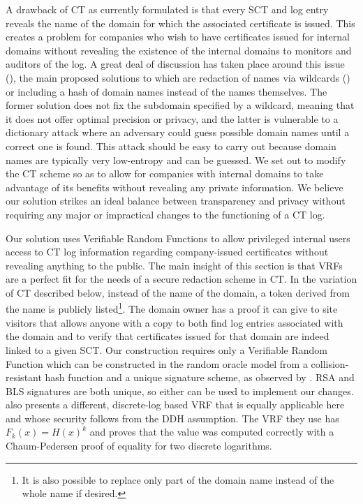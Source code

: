 \documentclass[letterpaper,twocolumn,10pt]{article}
\begin{document}
A drawback of CT as currently formulated is that every SCT and log entry reveals the name of the domain for which the associated certificate is issued. This creates a problem for companies who wish to have certificates issued for internal domains without revealing the existence of the internal domains to monitors and auditors of the log. A great deal of discussion has taken place around this issue (\cite{redaction-disc}), the main proposed solutions to which are redaction of names via wildcards (\cite{RFC-bis}) or including a hash of domain names instead of the names themselves. The former solution does not fix the subdomain specified by a wildcard, meaning that it does not offer optimal precision or privacy, and the latter is vulnerable to a dictionary attack where an adversary could guess possible domain names until a correct one is found. This attack should be easy to carry out because domain names are typically very low-entropy and can be guessed. We set out to modify the CT scheme so as to allow for companies with internal domains to take advantage of its benefits without revealing any private information. We believe our solution strikes an ideal balance between transparency and privacy without requiring any major or impractical changes to the functioning of a CT log.

Our solution uses Verifiable Random Functions to allow privileged internal users access to CT log information regarding company-issued certificates without revealing anything to the public. The main insight of this section is that VRFs are a perfect fit for the needs of a secure redaction scheme in CT. In the variation of CT described below, instead of the name of the domain, a token derived from the name is publicly listed\footnote{It is also possible to replace only part of the domain name instead of the whole name if desired.}. The domain owner has a proof it can give to site visitors that allows anyone with a copy to both find log entries associated with the domain and to verify that certificates issued for that domain are indeed linked to a given SCT. Our construction requires only a Verifiable Random Function \cite{MRV99} which can be constructed in the random oracle model from a collision-resistant hash function and a unique signature scheme, as observed by \cite{MBB+15}. RSA \cite{RSA78} and BLS \cite{BLS01} signatures are both unique, so either can be used to implement our changes. \cite{MBB+15} also presents a different, discrete-log based VRF that is equally applicable here and whose security follows from the DDH assumption. The VRF they use has $F_k(x)=H(x)^k$ and proves that the value was computed correctly with a Chaum-Pedersen proof of equality for two discrete logarithms.
\end{document}
